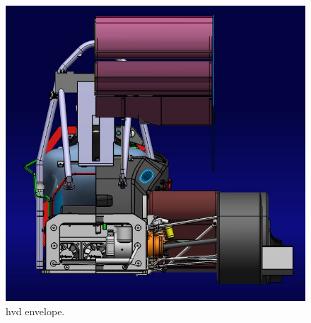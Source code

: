 \begin{figure}[H]
	\centering
	\includegraphics[width=\textwidth]{./img/hvd2.jpg}
	\caption{\Gls{hvd} envelope.}
	\label{fig:hvd2}
\end{figure}